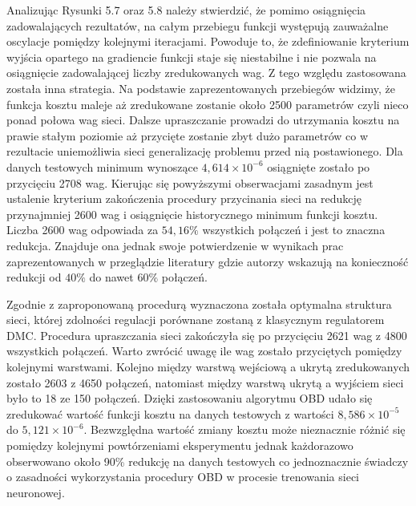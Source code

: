 \par Analizując Rysunki 5.7 oraz 5.8 należy stwierdzić, że pomimo osiągnięcia zadowalających rezultatów, na całym przebiegu funkcji występują zauważalne oscylacje pomiędzy kolejnymi iteracjami. Powoduje to, że zdefiniowanie kryterium wyjścia opartego na gradiencie funkcji staje się niestabilne i nie pozwala na osiągnięcie zadowalającej liczby zredukowanych wag. Z tego względu zastosowana została inna strategia. Na podstawie zaprezentowanych przebiegów widzimy, że funkcja kosztu maleje aż zredukowane zostanie około 2500 parametrów czyli nieco ponad połowa wag sieci. Dalsze upraszczanie prowadzi do utrzymania kosztu na prawie stałym poziomie aż przycięte zostanie zbyt dużo parametrów co w rezultacie uniemożliwia sieci generalizację problemu przed nią postawionego. Dla danych testowych minimum wynoszące \( 4,614\times10^{-6} \) osiągnięte zostało po przycięciu 2708 wag. Kierując się powyższymi obserwacjami zasadnym jest ustalenie kryterium zakończenia procedury przycinania sieci na redukcję przynajmniej 2600 wag i osiągnięcie historycznego minimum funkcji kosztu. Liczba 2600 wag odpowiada za \(54,16 \% \) wszystkich połączeń i jest to znaczna redukcja. Znajduje ona jednak swoje potwierdzenie w wynikach prac zaprezentowanych w przeglądzie literatury gdzie autorzy wskazują na konieczność redukcji od \(40\%\) do nawet \(60\%\) połączeń.

\par Zgodnie z zaproponowaną procedurą wyznaczona została optymalna struktura sieci, której zdolności regulacji porównane zostaną z klasycznym regulatorem DMC. Procedura upraszczania sieci zakończyła się po przycięciu 2621 wag z 4800 wszystkich połączeń. Warto zwrócić uwagę ile wag zostało przyciętych pomiędzy kolejnymi warstwami. Kolejno między warstwą wejściową a ukrytą zredukowanych zostało 2603 z 4650 połączeń, natomiast między warstwą ukrytą a wyjściem sieci było to 18 ze 150 połączeń. Dzięki zastosowaniu algorytmu OBD udało się zredukować wartość funkcji kosztu na danych testowych z wartości \( 8,586\times10^{-5} \) do \( 5,121\times10^{-6} \). Bezwzględna wartość zmiany kosztu może nieznacznie różnić się pomiędzy kolejnymi powtórzeniami eksperymentu jednak każdorazowo obserwowano około 90\% redukcję na danych testowych co jednoznacznie świadczy o zasadności wykorzystania procedury OBD w procesie trenowania sieci neuronowej.

